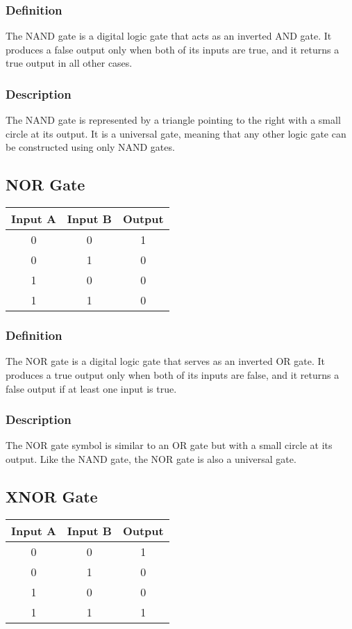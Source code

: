 \documentclass{article}
\begin{document}
\subsubsection{Definition} 
The NAND gate is a digital logic gate that acts as an inverted AND gate. It produces a false output only when both of its inputs are true, and it returns a true output in all other cases.

\subsubsection{Description} 
The NAND gate is represented by a triangle pointing to the right with a small circle at its output. It is a universal gate, meaning that any other logic gate can be constructed using only NAND gates.

\subsection{NOR Gate}
\begin{center}
  \begin{tabular}{|c|c|c|}
    \hline
    \textbf{Input A} & \textbf{Input B} & \textbf{Output} \\
    \hline
    0 & 0 & 1 \\
    0 & 1 & 0 \\
    1 & 0 & 0 \\
    1 & 1 & 0 \\
    \hline
  \end{tabular}
\end{center}

\subsubsection{Definition} 
The NOR gate is a digital logic gate that serves as an inverted OR gate. It produces a true output only when both of its inputs are false, and it returns a false output if at least one input is true.

\subsubsection{Description} 
The NOR gate symbol is similar to an OR gate but with a small circle at its output. Like the NAND gate, the NOR gate is also a universal gate.

\subsection{XNOR Gate}
\begin{center}
  \begin{tabular}{|c|c|c|}
    \hline
    \textbf{Input A} & \textbf{Input B} & \textbf{Output} \\
    \hline
    0 & 0 & 1 \\
    0 & 1 & 0 \\
    1 & 0 & 0 \\
    1 & 1 & 1 \\
    \hline
  \end{tabular}
\end{center}
\end{document}
